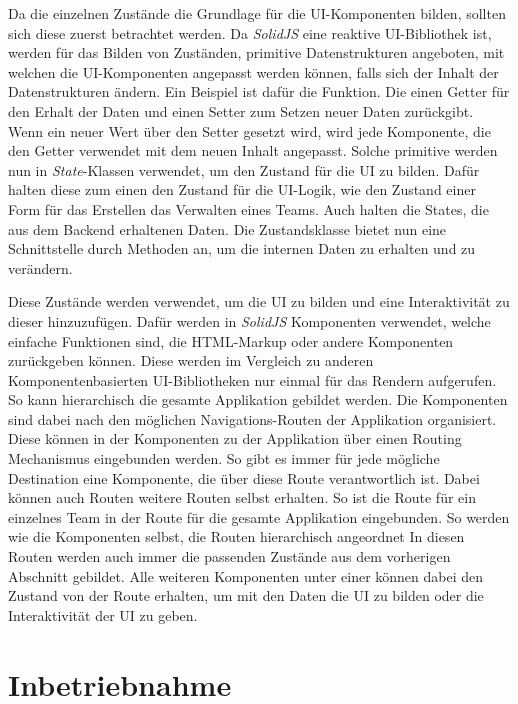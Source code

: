 Da die einzelnen Zustände die Grundlage für die UI-Komponenten bilden, sollten
sich diese zuerst betrachtet werden. Da \emph{SolidJS} eine reaktive
UI-Bibliothek ist, werden für das Bilden von Zuständen, primitive
Datenstrukturen angeboten, mit welchen die UI-Komponenten angepasst werden
können, falls sich der Inhalt der Datenstrukturen ändern. Ein Beispiel ist
dafür die  Funktion. Die einen Getter für den Erhalt der
Daten und einen Setter zum Setzen neuer Daten zurückgibt. Wenn ein neuer Wert
über den Setter gesetzt wird, wird jede Komponente, die den Getter verwendet
mit dem neuen Inhalt angepasst. Solche primitive werden nun in
\emph{State}-Klassen verwendet, um den Zustand für die UI zu bilden. Dafür
halten diese zum einen den Zustand für die UI-Logik, wie \zb{} den Zustand
einer Form für das Erstellen das Verwalten eines Teams. Auch halten die States, die aus dem
Backend erhaltenen Daten. Die Zustandsklasse bietet nun eine Schnittstelle
durch Methoden an, um die internen Daten zu erhalten und zu verändern.

Diese Zustände werden verwendet, um die UI zu bilden und eine Interaktivität zu
dieser hinzuzufügen. Dafür werden in \emph{SolidJS} \sog{} Komponenten
verwendet, welche einfache Funktionen sind, die HTML-Markup oder andere
Komponenten zurückgeben können. Diese werden im Vergleich zu anderen
Komponentenbasierten UI-Bibliotheken nur einmal für das Rendern aufgerufen. So
kann hierarchisch die gesamte Applikation gebildet werden. Die Komponenten sind
dabei nach den möglichen Navigations-Routen der Applikation organisiert. Diese
können in der  Komponenten zu der Applikation über einen Routing
Mechanismus eingebunden werden. So gibt es immer für jede mögliche Destination
eine  Komponente, die über diese Route verantwortlich ist. Dabei
können auch Routen weitere Routen selbst erhalten. So ist \zb{} die Route
für ein einzelnes Team in der Route für die gesamte Applikation eingebunden.
So werden wie die Komponenten selbst, die Routen hierarchisch angeordnet In
diesen Routen werden auch immer die passenden Zustände aus dem vorherigen Abschnitt
gebildet. Alle weiteren Komponenten unter einer  können dabei den Zustand
von der Route erhalten, um mit den Daten die UI zu bilden oder die Interaktivität
der UI zu geben.

\section{Inbetriebnahme}

